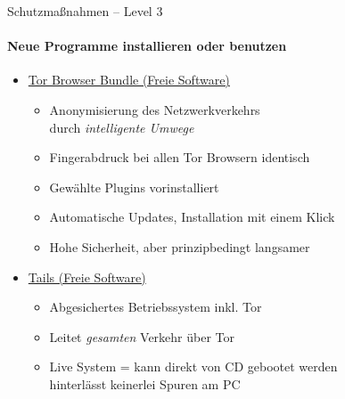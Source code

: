 \begin{frame}{Schutzmaßnahmen -- Level 3}
\framesubtitle{Neue Programme installieren oder benutzen}
  \begin{itemize}
    \item \href{https://www.torproject.org}{Tor Browser Bundle (Freie Software)}
    \begin{itemize}
      \item Anonymisierung des Netzwerkverkehrs\\durch \emph{\glqq intelligente Umwege\grqq}
      \item Fingerabdruck bei allen Tor Browsern identisch
      \item Gewählte Plugins vorinstalliert
      \item Automatische Updates, Installation mit einem Klick
      \item Hohe Sicherheit, aber prinzipbedingt langsamer
    \end{itemize}
    \item \href{https://tails.boum.org}{Tails (Freie Software)}
    \begin{itemize}
      \item Abgesichertes Betriebssystem inkl. Tor
      \item Leitet \emph{gesamten} Verkehr über Tor
      \item Live System = kann direkt von CD gebootet werden\\ hinterlässt keinerlei Spuren am PC
    \end{itemize}
  \end{itemize}
\end{frame}

\endinput
